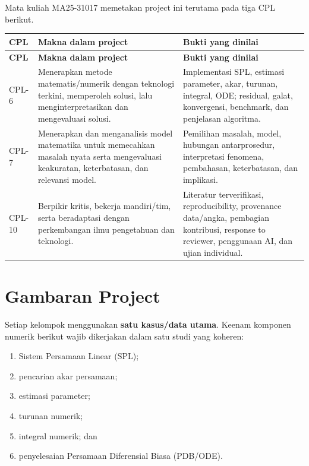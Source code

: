 \documentclass[11pt,a4paper]{article}
\begin{document}
Mata kuliah MA25-31017 memetakan project ini terutama pada tiga CPL berikut.

\begin{longtable}{L{1.2cm} L{6.6cm} L{6.6cm}}
\toprule
\textbf{CPL} & \textbf{Makna dalam project} & \textbf{Bukti yang dinilai} \\
\midrule
\endfirsthead
\toprule
\textbf{CPL} & \textbf{Makna dalam project} & \textbf{Bukti yang dinilai} \\
\midrule
\endhead
CPL-6 & Menerapkan metode matematis/numerik dengan teknologi terkini, memperoleh solusi, lalu menginterpretasikan dan mengevaluasi solusi. & Implementasi SPL, estimasi parameter, akar, turunan, integral, ODE; residual, galat, konvergensi, benchmark, dan penjelasan algoritma. \\
CPL-7 & Menerapkan dan menganalisis model matematika untuk memecahkan masalah nyata serta mengevaluasi keakuratan, keterbatasan, dan relevansi model. & Pemilihan masalah, model, hubungan antarprosedur, interpretasi fenomena, pembahasan, keterbatasan, dan implikasi. \\
CPL-10 & Berpikir kritis, bekerja mandiri/tim, serta beradaptasi dengan perkembangan ilmu pengetahuan dan teknologi. & Literatur terverifikasi, reproducibility, provenance data/angka, pembagian kontribusi, response to reviewer, penggunaan AI, dan ujian individual. \\
\bottomrule
\end{longtable}

\section{Gambaran Project}

Setiap kelompok menggunakan \textbf{satu kasus/data utama}. Keenam komponen numerik berikut wajib dikerjakan dalam satu studi yang koheren:

\begin{enumerate}
    \item Sistem Persamaan Linear (SPL);
    \item pencarian akar persamaan;
    \item estimasi parameter;
    \item turunan numerik;
    \item integral numerik; dan
    \item penyelesaian Persamaan Diferensial Biasa (PDB/ODE).
\end{enumerate}
\end{document}
